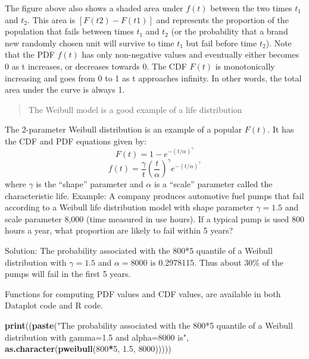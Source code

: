 \documentclass[]{book}
\newenvironment{Shaded}{\begin{snugshade}}{\end{snugshade}}
\newcommand{\KeywordTok}[1]{\textcolor[rgb]{0.13,0.29,0.53}{\textbf{#1}}}
\newcommand{\DecValTok}[1]{\textcolor[rgb]{0.00,0.00,0.81}{#1}}
\newcommand{\FloatTok}[1]{\textcolor[rgb]{0.00,0.00,0.81}{#1}}
\newcommand{\StringTok}[1]{\textcolor[rgb]{0.31,0.60,0.02}{#1}}
\newcommand{\OperatorTok}[1]{\textcolor[rgb]{0.81,0.36,0.00}{\textbf{#1}}}
\newcommand{\NormalTok}[1]{#1}
\theoremstyle{definition}
\theoremstyle{definition}
\theoremstyle{definition}
\theoremstyle{remark}
\begin{document}
The figure above also shows a shaded area under \(f(t)\) between the two
times \(t_1\) and \(t_2\). This area is \([F(t2)−F(t1)]\) and represents
the proportion of the population that fails between times \(t_1\) and
\(t_2\) (or the probability that a brand new randomly chosen unit will
survive to time \(t_1\) but fail before time \(t_2\)). Note that the PDF
\(f(t)\) has only non-negative values and eventually either becomes 0 as
t increases, or decreases towards 0. The CDF \(F(t)\) is monotonically
increasing and goes from 0 to 1 as t approaches infinity. In other
words, the total area under the curve is always 1.

\begin{quote}
The Weibull model is a good example of a life distribution
\end{quote}

The 2-parameter Weibull distribution is an example of a popular
\(F(t)\). It has the CDF and PDF equations given by:
\[F(t)= 1-e^{-(t/\alpha)^\gamma}\]
\[f(t)=\frac{\gamma}{t} \left(\frac{t}{\alpha} \right)^\gamma e^{-(t/\alpha)^\gamma}\]
where \(\gamma\) is the ``shape'' parameter and \(\alpha\) is a
``scale'' parameter called the characteristic life. Example: A company
produces automotive fuel pumps that fail according to a Weibull life
distribution model with shape parameter \(\gamma=1.5\) and scale
parameter 8,000 (time measured in use hours). If a typical pump is used
800 hours a year, what proportion are likely to fail within 5 years?

Solution: The probability associated with the 800*5 quantile of a
Weibull distribution with \(\gamma=1.5\) and \(\alpha=8000\) is
0.2978115. Thus about 30\% of the pumps will fail in the first 5 years.

Functions for computing PDF values and CDF values, are available in both
Dataplot code and R code.

\begin{Shaded}
\begin{Highlighting}[]
\KeywordTok{print}\NormalTok{((}\KeywordTok{paste}\NormalTok{(}\StringTok{"The probability associated with the 800*5 quantile of a Weibull distribution with gamma=1.5 and alpha=8000 is"}\NormalTok{, }\KeywordTok{as.character}\NormalTok{(}\KeywordTok{pweibull}\NormalTok{(}\DecValTok{800}\OperatorTok{*}\DecValTok{5}\NormalTok{, }\FloatTok{1.5}\NormalTok{, }\DecValTok{8000}\NormalTok{)))))}
\end{Highlighting}
\end{Shaded}
\end{document}
